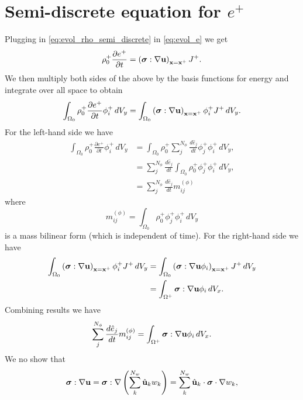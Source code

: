 \documentclass[11pt]{article}
\begin{document}
\section{Semi-discrete equation for $e^+$}
Plugging in \cref{eq:evol_rho_semi_discrete} in \cref{eq:evol_e} we get
\begin{equation}
    \rho^+_0 \frac{\partial e^+}{\partial t} = \left ( \bm \sigma : \nabla \mathbf{u} \right )_{\mathbf{x} = \mathbf{x}^+} J^+.
\end{equation}
We then multiply both sides of the above by the basis functions for energy and integrate over all space to obtain
\begin{equation}
    \int_{\Omega_0} \rho^+_0 \frac{\partial e^+}{\partial t} \phi_i^+ \, dV_y = \int_{\Omega_0} \left ( \bm \sigma : \nabla \mathbf{u} \right )_{\mathbf{x} = \mathbf{x}^+} \phi_i^+ J^+ \, dV_y.
\end{equation}
For the left-hand side we have
\begin{align}
    \int_{\Omega_0} \rho^+_0 \frac{\partial e^+}{\partial t} \phi_i^+ \, dV_y &= \int_{\Omega_0} \rho^+_0 \sum_j^{N_\phi} \frac{d \hat{e}_j}{dt} \phi_j^+ \phi_i^+ \, dV_y , \nonumber \\
    &= \sum_j^{N_\phi} \frac{d \hat{e}_j}{dt} \int_{\Omega_0} \rho^+_0 \phi_j^+ \phi_i^+ \, dV_y , \nonumber \\
    &= \sum_j^{N_\phi} \frac{d \hat{e}_j}{dt} m_{ij}^{(\phi)}
\end{align}
where
\begin{equation}
    m_{ij}^{(\phi)} = \int_{\Omega_0} \rho^+_0 \phi_j^+ \phi_i^+ \, dV_y
\end{equation}
is a mass bilinear form (which is independent of time). For the right-hand side we have
\begin{align}
    \int_{\Omega_0} \left ( \bm \sigma : \nabla \mathbf{u} \right )_{\mathbf{x} = \mathbf{x}^+} \phi_i^+ J^+ \, dV_y &= \int_{\Omega_0} \left ( \bm \sigma : \nabla \mathbf{u} \phi_i \right )_{\mathbf{x} = \mathbf{x}^+} J^+ \, dV_y \nonumber \\
    &= \int_{\Omega^+} \bm \sigma : \nabla \mathbf{u} \phi_i \, dV_x. 
\end{align}
Combining results we have
\begin{equation}
    \sum_j^{N_\phi} \frac{d \hat{e}_j}{dt} m_{ij}^{(\phi)} = \int_{\Omega^+} \bm \sigma : \nabla \mathbf{u} \phi_i \, dV_x.
\end{equation}
We no show that
\begin{equation}
    \bm \sigma : \nabla \mathbf{u} = \bm \sigma : \nabla \left ( \sum_k^{N_w} \hat{\mathbf{u}}_k w_k \right ) = \sum_k^{N_w} \hat{\mathbf{u}}_k \cdot \bm \sigma \cdot \nabla w_k,
\end{equation}
\end{document}
